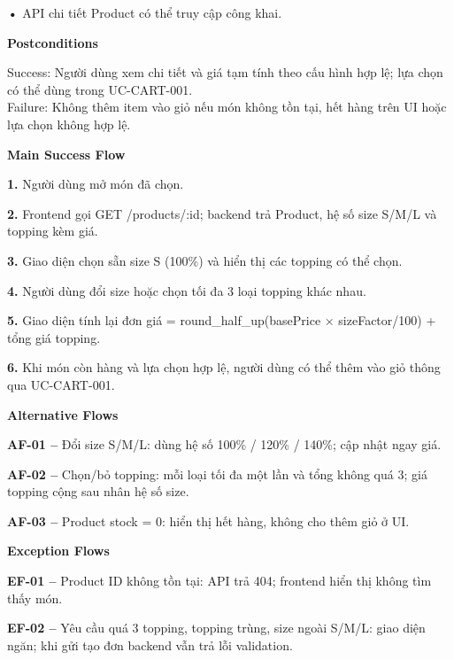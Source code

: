 \documentclass[11pt,a4paper,oneside]{report}
\begin{document}
\textbf{•} API chi tiết Product có thể truy cập công khai.
\par

\par\smallskip\noindent\textcolor{sgublue}{\textbf{Postconditions}}\par\nobreak
Success: Người dùng xem chi tiết và giá tạm tính theo cấu hình hợp lệ; lựa chọn có thể dùng trong UC-CART-001.\\
Failure: Không thêm item vào giỏ nếu món không tồn tại, hết hàng trên UI hoặc lựa chọn không hợp lệ.\strut
\par

\par\smallskip\noindent\textcolor{sgublue}{\textbf{Main Success Flow}}\par\nobreak
\textbf{1.} Người dùng mở món đã chọn.

\textbf{2.} Frontend gọi GET /products/:id; backend trả Product, hệ số size S/M/L và topping kèm giá.

\textbf{3.} Giao diện chọn sẵn size S (100\%) và hiển thị các topping có thể chọn.

\textbf{4.} Người dùng đổi size hoặc chọn tối đa 3 loại topping khác nhau.

\textbf{5.} Giao diện tính lại đơn giá = round\_half\_up(basePrice × sizeFactor/100) + tổng giá topping.

\textbf{6.} Khi món còn hàng và lựa chọn hợp lệ, người dùng có thể thêm vào giỏ thông qua UC-CART-001.
\par

\par\smallskip\noindent\textcolor{sgublue}{\textbf{Alternative Flows}}\par\nobreak
\textbf{AF-01 --} Đổi size S/M/L: dùng hệ số 100\% / 120\% / 140\%; cập nhật ngay giá.

\textbf{AF-02 --} Chọn/bỏ topping: mỗi loại tối đa một lần và tổng không quá 3; giá topping cộng sau nhân hệ số size.

\textbf{AF-03 --} Product stock = 0: hiển thị hết hàng, không cho thêm giỏ ở UI.
\par

\par\smallskip\noindent\textcolor{sgublue}{\textbf{Exception Flows}}\par\nobreak
\textbf{EF-01 --} Product ID không tồn tại: API trả 404; frontend hiển thị không tìm thấy món.

\textbf{EF-02 --} Yêu cầu quá 3 topping, topping trùng, size ngoài S/M/L: giao diện ngăn; khi gửi tạo đơn backend vẫn trả lỗi validation.
\end{document}
